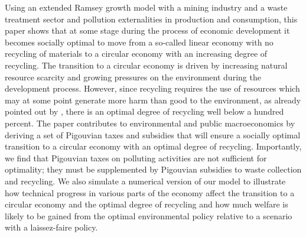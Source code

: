 Using an extended Ramsey growth model with a mining industry and a waste treatment sector and pollution externalities in production and consumption, this paper shows that at some stage during the process of economic development it becomes socially optimal to move from a so-called linear economy with no recycling of materials to a circular economy with an increasing degree of recycling. The transition to a circular economy is driven by increasing natural resource scarcity and growing pressures on the environment during the development process. However, since recycling requires the use of resources which may at some point generate more harm than good to the environment, as already pointed out by \textcite{baumol1977}, there is an optimal degree of recycling well below a hundred percent. The paper contributes to environmental and public macroeconomics by deriving a set of Pigouvian taxes and subsidies that will ensure a socially optimal transition to a circular economy with an optimal degree of recycling. Importantly, we find that Pigouvian taxes on polluting activities are not sufficient for optimality; they must be supplemented by Pigouvian subsidies to waste collection and recycling. We also simulate a numerical version of our model to illustrate how technical progress in various parts of the economy affect the transition to a circular economy and the optimal degree of recycling and how much welfare is likely to be gained from the optimal environmental policy relative to a scenario with a laissez-faire policy.

